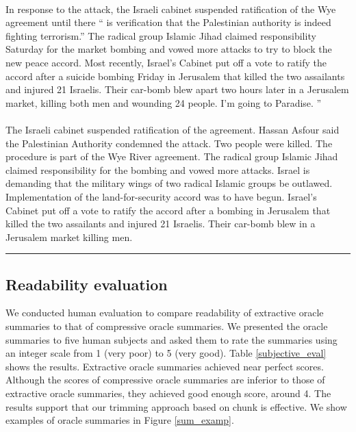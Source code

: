\documentclass[11pt,a4paper]{article}
\begin{document}
\begin{figure*}[tb]
\begin{flushleft}
\begin{small}
  \vspace{2mm}
 \\
In response to the attack, the Israeli cabinet suspended ratification of the Wye agreement until there `` is verification that the Palestinian authority is indeed fighting terrorism.''
The radical group Islamic Jihad claimed responsibility Saturday for the market bombing and vowed more attacks to try to block the new peace accord.
Most recently, Israel's Cabinet put off a vote to ratify the accord after a suicide bombing Friday in Jerusalem that killed the two assailants and injured 21 Israelis.
Their car-bomb blew apart two hours later in a Jerusalem market, killing
   both men and wounding 24 people. I'm going to Paradise. ''\\
   \vspace{2mm}
\\
The Israeli cabinet suspended ratification of the agreement.
Hassan Asfour said the Palestinian Authority condemned the attack.
Two people were killed.
The procedure is part of the Wye River agreement.
The radical group Islamic Jihad claimed responsibility for the bombing
   and vowed more attacks. Israel is demanding that the military wings of two radical Islamic groups be outlawed.
Implementation of the land-for-security accord was to have begun.
Israel's Cabinet put off a vote to ratify the accord after a bombing in Jerusalem that killed the two assailants and injured 21 Israelis.
Their car-bomb blew in a Jerusalem market killing men.\\
\hrule
\end{small}
  \caption{Summaries obtained from topic:D30010}
    \label{sum_examp}
\end{flushleft}
\end{figure*}

\subsection{Readability evaluation}

We conducted human evaluation to compare readability of extractive oracle summaries to
that of compressive oracle summaries.
We presented the oracle summaries to five human subjects and asked them
to rate the summaries using an integer scale from 1 (very poor) to 5 (very good).
Table \ref{subjective_eval} shows the results.
Extractive oracle summaries achieved near perfect scores.
Although the scores of compressive oracle summaries are inferior to those of
extractive oracle summaries, they achieved good enough score,
around 4.
 The results support that our trimming approach based on chunk
is effective. We show examples of oracle summaries 
in Figure \ref{sum_examp}.
\end{document}
